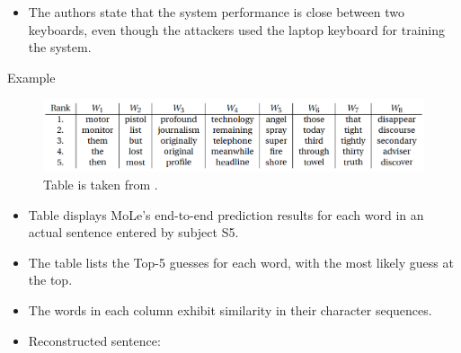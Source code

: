\documentclass[ucs,9pt,usenames,dvipsnames]{beamer}
\begin{document}
\begin{frame}
\begin{itemize}
	
	\item  The authors state that the system performance is close between two keyboards, even though 	the attackers used the laptop keyboard for training the system. 
	
 \end{itemize}
 \end{frame}
 


\begin{frame}{Example}
	\begin{figure}
		\centering
		\includegraphics[width=\linewidth]{imgs/sentence.png}
		\caption{Table is taken from \cite{b1}.}
	\end{figure}

\begin{itemize}
 	\item Table displays MoLe's end-to-end prediction results for each word in an actual sentence entered by subject S5. 
 	\item The table lists the Top-5 guesses for each word, with the most likely guess at the top. \item The words in each column exhibit similarity in their character sequences. 
 	\pause 
 	\item Reconstructed sentence:
 	
 	 {}
\end{itemize}
\end{frame}
\end{document}
